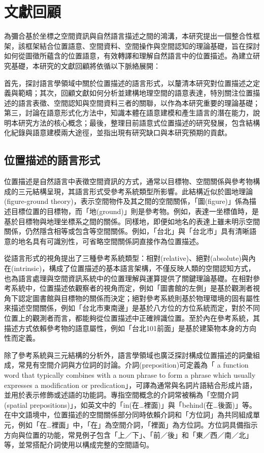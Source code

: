 
\chapter{文獻回顧}

為彌合基於坐標之空間資訊與自然語言描述之間的鴻溝，本研究提出一個整合性框架，該框架結合位置語意、空間資料、空間操作與空間認知的理論基礎，旨在探討如何從圖徵所蘊含的位置語意，有效轉譯和理解自然語言中的位置描述。為建立研究基礎，本研究的文獻回顧將依循以下脈絡展開：

首先，探討語言學領域中關於位置描述的語言形式，以釐清本研究對位置描述之定義與範疇；其次，回顧文獻如何分析並建構地理空間的語意表達，特別關注位置描述的語言表徵、空間認知與空間資料三者的關聯，以作為本研究重要的理論基礎；第三，討論在語意形式化方法中，知識本體在語意建模和產生語言的潛在能力，說明本研究方法的核心概念；最後，整理目前語意式位置描述的研究發展，包含結構化紀錄與語意建模兩大途徑，並指出現有研究缺口與本研究預期的貢獻。

\section{位置描述的語言形式}

位置描述是自然語言中表徵空間資訊的方式，通常以目標物、空間關係與參考物構成的三元結構呈現，其語言形式受參考系統類型所影響。此結構近似於圖地理論(figure-ground theory)，表示空間物件及其之間的空間關係，「圖(figure)」係為描述目標位置的目標物，而「地(ground)」則是參考物\citep{RN93, RN104}。例如，表達一坐標值時，是基於目標物與地理坐標系之間的關係。同樣地，即便如地名的表達上雖未明示空間關係，仍然隱含相等或包含等空間關係。例如，「台北」與「台北市」具有清晰語意的地名具有可識別性，可省略空間關係詞直接作為位置描述\citep{RN93}。

\citet{RN2}從語言形式的視角提出了三種參考系統類型：相對(relative)、絕對(absolute)與內在(intrinsic)，構成了位置描述的基本語言架構，不僅反映人類的空間認知方式，也為語言處理與空間資訊系統中的位置理解與運算提供了關鍵理論基礎。在相對參考系統中，位置描述依觀察者的視角而定，例如「圖書館的左側」是基於觀測者視角下認定圖書館與目標物的關係而決定；絕對參考系統則基於物理環境的固有屬性來描述空間關係，例如「台北市東南邊」是基於八方位的方位系統而定，對於不同位置上的觀測者而言，都能夠從位置描述中正確辨識位置。至於內在參考系統，其描述方式依賴參考物的語意屬性，例如「台北101前面」是基於建築物本身的方向性而定義。

除了參考系統與三元結構的分析外，語言學領域也廣泛探討構成位置描述的詞彙組成，常見有空間介詞與方位詞的討論。介詞(preposition)可定義為「 a function word that typically combines with a noun phrase to form a phrase which usually expresses a modification or predication」\citep{RN188}，可譯為通常與名詞片語結合形成片語，並用於表示修飾或述語的功能詞。專指空間概念的介詞常被稱為「空間介詞(spatial prepositions)」，如英文中的「in(在…裡面)」與「behind(在…後面)」等。在中文語境中，位置描述的空間關係部分同時依賴介詞和「方位詞」為共同組成單元，例如「在…裡面」中，「在」為空間介詞，「裡面」為方位詞\citep{RN46, RN189, RN190}。方位詞具備指示方向與位置的功能，常見例子包含「上／下」、「前／後」和「東／西／南／北」等，並常搭配介詞使用以構成完整的空間語句。


